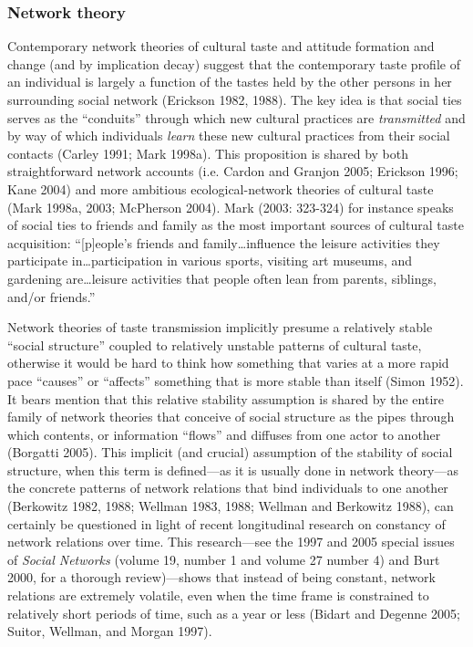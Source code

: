 \subsubsection{Network theory}\label{network-theory}

Contemporary network theories of cultural taste and attitude formation and change (and by implication decay) suggest that the contemporary taste profile of an individual is largely a function of the tastes held by the other persons in her surrounding social network (Erickson 1982, 1988). The key idea is that social ties serves as the ``conduits'' through which new cultural practices are \emph{transmitted} and by way of which individuals \emph{learn} these new cultural practices from their social contacts (Carley 1991; Mark 1998a). This proposition is shared by both straightforward network accounts (i.e. Cardon and Granjon 2005; Erickson 1996; Kane 2004) and more ambitious ecological-network theories of cultural taste (Mark 1998a, 2003; McPherson 2004). Mark (2003: 323-324) for instance speaks of social ties to friends and family as the most important sources of cultural taste acquisition: ``{[}p{]}eople's friends and family\ldots influence the leisure activities they participate in\ldots participation in various sports, visiting art museums, and gardening are\ldots leisure activities that people often lean from parents, siblings, and/or friends.''

Network theories of taste transmission implicitly presume a relatively stable ``social structure'' coupled to relatively unstable patterns of cultural taste, otherwise it would be hard to think how something that varies at a more rapid pace ``causes'' or ``affects'' something that is more stable than itself (Simon 1952). It bears mention that this relative stability assumption is shared by the entire family of network theories that conceive of social structure as the pipes through which contents, or information ``flows'' and diffuses from one actor to another (Borgatti 2005). This implicit (and crucial) assumption of the stability of social structure, when this term is defined---as it is usually done in network theory---as the concrete patterns of network relations that bind individuals to one another (Berkowitz 1982, 1988; Wellman 1983, 1988; Wellman and Berkowitz 1988), can certainly be questioned in light of recent longitudinal research on constancy of network relations over time. This research---see the 1997 and 2005 special issues of \emph{Social Networks} (volume 19, number 1 and volume 27 number 4) and Burt 2000, for a thorough review)---shows that instead of being constant, network relations are extremely volatile, even when the time frame is constrained to relatively short periods of time, such as a year or less (Bidart and Degenne 2005; Suitor, Wellman, and Morgan 1997).

